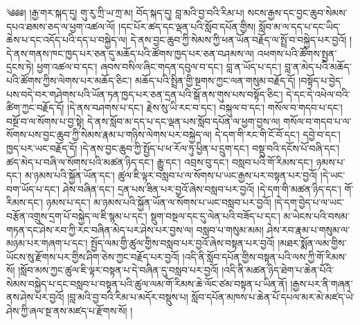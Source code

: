 \setcounter{footnote}{0} 
༄༅༅། །རྒྱ་གར་སྐད་དུ། གུ་རུ་ཀྲི་ཡ་ཀྲ་མ། བོད་སྐད་དུ། བླ་མའི་བྱ་བའི་རིམ་པ། སངས་རྒྱས་དང་བྱང་ཆུབ་སེམས་དཔའ་ཐམས་ཅད་ལ་ཕྱག་འཚལ་ལོ། །དང་པོར་ཚད་དང་ལྡན་པའི་སློབ་དཔོན་གྱིས། སློབ་མ་ལ་དད་པ་དང་ཡིད་ཆེས་པ་དང་འདོད་པའི་དད་པ་བསྐྱེད་ལ། དེ་ནས་བྱང་ཆུབ་ཀྱི་སེམས་ཀྱི་ཕན་ཡོན་བརྗོད་ལ་སྤྲོ་བ་བསྐྱེད་པར་བྱའོ། །དེ་ནས་གནས་ཁང་ཁྱད་པར་ཅན་དུ་མཆོད་པའི་ཚོགས་ཁྱད་པར་ཅན་བཤམས་ལ། འཕགས་པའི་ཚོགས་སྤྱན་དྲངས་ཏེ། ཕྱག་འཚལ་བ་དང་། ཞབས་བསིལ་ཞིང་གདན་དབུལ་བ་དང་། བླ་ན་ཡོད་པ་དང་། བླ་ན་མེད་པའི་མཆོད་པའི་ཚོགས་ཀྱིས་ལེགས་པར་མཆོད་ཅིང་། མཆོད་པའི་སྤྲིན་གྱི་སྔགས་ཀྱང་ལན་གསུམ་བརྗོད་དོ། །བསྟོད་པ་བྱེད་པས་བདེ་བར་གཤེགས་པའི་ཡོན་ཏན་ཁྱད་པར་ཅན་དྲན་པའི་སྒོ་ནས་གུས་པས་བསྟོད་ཅིང་། དེ་དང་དེ་འཕེལ་བའི་ཚིག་ཀྱང་བརྗོད་དོ། །དེ་ནས་བཤགས་པ་དང་། རྗེས་སུ་ཡི་རང་བ་དང་། བསྐུལ་བ་དང་། གསོལ་བ་གདབ་པ་དང་། བསྔོ་བ་ལ་སོགས་པ་བྱ་སྟེ། དེ་ནས་སློབ་མ་དད་པ་དང་ལྡན་པས་སློབ་དཔོན་ལ་ཕྱག་བྱས་ལ། གསོལ་བ་གདབ་པ་ལ་སོགས་པས་བྱང་ཆུབ་ཀྱི་སེམས་རྣམ་པ་གཉིས་ལེགས་པར་བསྐྱེད་ལ། དེ་དག་གི་རང་གི་ངོ་བོ་དང་། དབྱེ་བ་དང་། ཁྱད་པར་ཡང་བརྗོད་དོ། །དེ་ནས་བྱང་ཆུབ་ཀྱི་སྤྱོད་པ་ཕ་རོལ་ཏུ་ཕྱིན་པ་དྲུག་དང་། བསྡུ་བའི་དངོས་པོ་བཞི་དང་། ཚད་མེད་པ་བཞི་ལ་སོགས་པའི་མཚན་ཉིད་དང་། རྒྱུ་དང་། འབྲས་བུ་དང་། བསླབ་པའི་གོ་རིམས་དང་། ཉམས་པ་དང་། མ་ཉམས་པའི་སྐྱོན་ཡོན་དང་། ཚུལ་ཇི་ལྟར་བསླབ་པ་ལ་སོགས་པ་ཡང་རྒྱས་པར་བསྟན་པར་བྱའོ། །དེ་ཡང་བག་ཡོད་པ་དང་། ཤེས་བཞིན་དང་། དྲན་པས་ཟིན་པར་བྱའོ་ཞེས་བསླབ་པར་བྱའོ། །དེ་དག་གི་མཚན་ཉིད་དང་། གོ་རིམས་དང་། ཉམས་པ་དང་། མ་ཉམས་པའི་སྐྱོན་ཡོན་ལ་སོགས་པ་ཡང་བསླབ་པར་བྱའོ། །དེ་དག་བྱེད་པ་ལ་ཡང་བརྩོན་འགྲུས་དྲག་པོ་བསྐྱེད་ལ་ཇི་སྙམ་པ་དང་། སྡུག་བསྔལ་དང་དུ་ལེན་པའི་བཟོད་པ་དང་། མ་ཡེངས་པའི་བསམ་གཏན་དང་ཤེས་རབ་ཀྱི་རང་བཞིན་མེད་པར་ཤེས་པར་བྱས་ལ། བསླབ་པ་གསུམ་མམ། ཤེས་རབ་རྣམ་པ་གསུམ་ལ་མཉམ་པར་གཞག་པ་དང་། སྤྱོད་ལམ་གྱི་ཚུལ་གྱིས་བསླབ་པར་བྱའོ་ཞེས་བསྟན་པར་བྱའོ། །མཐར་སྨོན་ལམ་གྱིས་ཡོངས་སུ་རྫོགས་པར་གྱིས་ཤིག་ཅེས་ཀྱང་བརྗོད་པར་བྱའོ། །འདི་ནི་སློབ་དཔོན་གྱིས་བསྟན་པའི་ལས་ཀྱི་གོ་རིམས་སོ། །སློབ་མས་ཀྱང་ཚུལ་ཇི་ལྟར་བསྟན་པ་དེ་བཞིན་དུ་བསླབ་པར་བྱའོ། །འདི་ནི་མཚན་ཉིད་ཐེག་པ་ཆེན་པོའི་སེམས་བསྐྱེད་པ་དང་བསླབ་པ་བསྟན་པའི་ཚུལ་ལམ་གོ་རིམས་ཆེ་ལོང་ཙམ་བསྟན་པ་ཡིན་ནོ། །རྒྱས་པར་ནི་གཞན་ནས་ཤེས་པར་བྱའོ། །བླ་མའི་བྱ་བའི་རིམ་པ་མདོར་བསྡུས་པ། སློབ་དཔོན་མཁས་པ་ཆེན་པོ་དཔལ་མར་མེ་མཛད་ཡེ་ཤེས་ཀྱི་ཞལ་སྔ་ནས་མཛད་པ་རྫོགས་སོ། །
